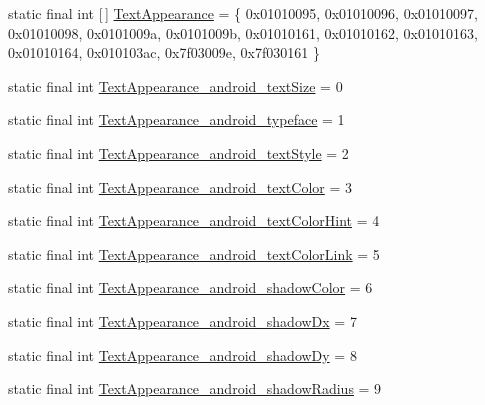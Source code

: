 \begin{DoxyCompactItemize}
\item 
static final int \mbox{[}$\,$\mbox{]} \mbox{\hyperlink{classandroid_1_1support_1_1design_1_1R_1_1styleable_a23dc46ec989f92f528b46568dad7e726}{Text\+Appearance}} = \{ 0x01010095, 0x01010096, 0x01010097, 0x01010098, 0x0101009a, 0x0101009b, 0x01010161, 0x01010162, 0x01010163, 0x01010164, 0x010103ac, 0x7f03009e, 0x7f030161 \}
\item 
static final int \mbox{\hyperlink{classandroid_1_1support_1_1design_1_1R_1_1styleable_a4ca078b59bd3cea0f1cc46eb1ba33efa}{Text\+Appearance\+\_\+android\+\_\+text\+Size}} = 0
\item 
static final int \mbox{\hyperlink{classandroid_1_1support_1_1design_1_1R_1_1styleable_aa5911a5763e1b03e8ea594230ad9f1a5}{Text\+Appearance\+\_\+android\+\_\+typeface}} = 1
\item 
static final int \mbox{\hyperlink{classandroid_1_1support_1_1design_1_1R_1_1styleable_afdc1e2a3b8c14b12194550bf78f9b051}{Text\+Appearance\+\_\+android\+\_\+text\+Style}} = 2
\item 
static final int \mbox{\hyperlink{classandroid_1_1support_1_1design_1_1R_1_1styleable_a129155598b9f1854731c9f078ece488f}{Text\+Appearance\+\_\+android\+\_\+text\+Color}} = 3
\item 
static final int \mbox{\hyperlink{classandroid_1_1support_1_1design_1_1R_1_1styleable_a7bbcec77aa5ef2ece2ad0d9e504296f3}{Text\+Appearance\+\_\+android\+\_\+text\+Color\+Hint}} = 4
\item 
static final int \mbox{\hyperlink{classandroid_1_1support_1_1design_1_1R_1_1styleable_aff2b855100a28f0ce04d9ac2cb1b812b}{Text\+Appearance\+\_\+android\+\_\+text\+Color\+Link}} = 5
\item 
static final int \mbox{\hyperlink{classandroid_1_1support_1_1design_1_1R_1_1styleable_a6f271140407acd9fe3f06b8fba7c107e}{Text\+Appearance\+\_\+android\+\_\+shadow\+Color}} = 6
\item 
static final int \mbox{\hyperlink{classandroid_1_1support_1_1design_1_1R_1_1styleable_a5e7de3b733daea5868861df0dfa76062}{Text\+Appearance\+\_\+android\+\_\+shadow\+Dx}} = 7
\item 
static final int \mbox{\hyperlink{classandroid_1_1support_1_1design_1_1R_1_1styleable_a4f96e3e9d52b106bfa676c09e87a73c8}{Text\+Appearance\+\_\+android\+\_\+shadow\+Dy}} = 8
\item 
static final int \mbox{\hyperlink{classandroid_1_1support_1_1design_1_1R_1_1styleable_a57fc574506aa93a9939345f27539bd48}{Text\+Appearance\+\_\+android\+\_\+shadow\+Radius}} = 9
\item 

\end{DoxyCompactItemize}
